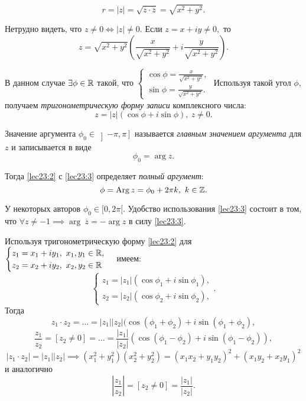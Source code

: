 \documentclass[../../main.tex]{subfiles}
\begin{document}
	\[r = |z| = \sqrt{z\cdot \overline{z}} = \sqrt{x^2+y^2}.\]
	
	Нетрудно видеть, что $z \neq 0 \iff |z| \neq 0.$ Если
	 $z = x+iy \neq 0,$ то \[z = \sqrt{x^2+y^2}\left(\frac{x}{\sqrt{x^2+y^2}}
	 + i\frac{y}{\sqrt{x^2+y^2}}\right). \] 
	
	В данном случае $\exists \phi\in\mathbb{R}$ такой, что 
	$\begin{cases} 
	\cos \phi = \frac{x}{\sqrt{x^2+y^2}},\\
	\sin \phi = \frac{y}{\sqrt{x^2+y^2}}.
	\end{cases}$ Используя такой угол $\phi$, получаем
	\emph{тригонометрическую форму записи} комплексного числа:
	\begin{equation}\label{lec23:2}
	z = |z|(\cos \phi + i \sin\phi),\ z\neq 0.
	\end{equation} 
	
	Значение аргумента ${\phi}_0 \in \left]-\pi, \pi\right]$ называется \emph{главным
	значением аргумента} для $z$ и записывается в виде
	\begin{equation}
	\label{lec23:3}
	{\phi}_0 = \arg z.
	\end{equation}
	
	Тогда \eqref{lec23:2} с \eqref{lec23:3} определяет \emph{полный аргумент}:
	\[ \phi = \operatorname{Arg} z = {\phi}_0+2\pi k,\ k\in\mathbb{Z}. \]
	
	У некоторых авторов ${\phi}_0\in[0, 2\pi[.$ Удобство использования
	\eqref{lec23:3} состоит в том, что $\forall z \neq -1 \implies \arg\
	\overline{z} = - \arg z$ в силу  \eqref{lec23:3}.
	
	Используя тригонометрическую форму  \eqref{lec23:2} для  
	$\begin{cases} 
	z_1 =  x_1+iy_1,\ x_1, y_1\in \mathbb{R},\\
	z_2 =  x_2+iy_2,\ x_2, y_2\in \mathbb{R}
	\end{cases}$ имеем:
	\[\begin{cases} 
	z_1 = |z_1|(\cos {\phi}_1 + i\sin {\phi}_1),\\
	z_2 =  |z_2|(\cos {\phi}_2 + i\sin {\phi}_2),
	\end{cases}.\] Тогда
	\[z_1\cdot z_2 = \ldots = |z_1| |z_2|(\cos({\phi}_1+{\phi}_2)+
	i\sin({\phi}_1+{\phi}_2),\]
	\[\frac{z_1}{z_2} =[z_2 \neq 0] = \ldots =\frac{ |z_1|}{ |z_2|}
	(\cos({\phi}_1-{\phi}_2)+i\sin({\phi}_1-{\phi}_2)),\]
	\[ |z_1\cdot z_2| = |z_1||z_2| \implies (x_1^2+y_1^2)(x_2^2+y_2^2)
	 = (x_1x_2 + y_1y_2)^2 + (x_1y_2+x_2y_1)^2 \]
	и аналогично \[\left|\frac{z_1}{z_2}\right| = [z_2 \neq 0] = \frac{|z_1|}{|z_2|}.\]
	
\end{document}
